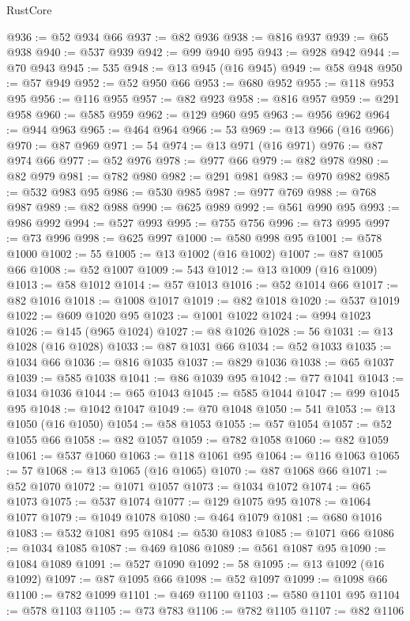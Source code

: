 \begin{lexlean}{RustCore}
\begin{coremodule}
@936 := @52 @934 @66
@937 := @82 @936
@938 := @816 @937
@939 := @65 @938
@940 := @537 @939
@942 := @99 @940 @95
@943 := @928 @942
@944 := @70 @943
@945 := 535
@948 := @13 @945 (@16 @945)
@949 := @58 @948
@950 := @57 @949
@952 := @52 @950 @66
@953 := @680 @952
@955 := @118 @953 @95
@956 := @116 @955
@957 := @82 @923
@958 := @816 @957
@959 := @291 @958
@960 := @585 @959
@962 := @129 @960 @95
@963 := @956 @962
@964 := @944 @963
@965 := @464 @964
@966 := 53
@969 := @13 @966 (@16 @966)
@970 := @87 @969
@971 := 54
@974 := @13 @971 (@16 @971)
@976 := @87 @974 @66
@977 := @52 @976
@978 := @977 @66
@979 := @82 @978
@980 := @82 @979
@981 := @782 @980
@982 := @291 @981
@983 := @970 @982
@985 := @532 @983 @95
@986 := @530 @985
@987 := @977 @769
@988 := @768 @987
@989 := @82 @988
@990 := @625 @989
@992 := @561 @990 @95
@993 := @986 @992
@994 := @527 @993
@995 := @755 @756
@996 := @73 @995
@997 := @73 @996
@998 := @625 @997
@1000 := @580 @998 @95
@1001 := @578 @1000
@1002 := 55
@1005 := @13 @1002 (@16 @1002)
@1007 := @87 @1005 @66
@1008 := @52 @1007
@1009 := 543
@1012 := @13 @1009 (@16 @1009)
@1013 := @58 @1012
@1014 := @57 @1013
@1016 := @52 @1014 @66
@1017 := @82 @1016
@1018 := @1008 @1017
@1019 := @82 @1018
@1020 := @537 @1019
@1022 := @609 @1020 @95
@1023 := @1001 @1022
@1024 := @994 @1023
@1026 := @145 (@965 @1024)
@1027 := @8 @1026
@1028 := 56
@1031 := @13 @1028 (@16 @1028)
@1033 := @87 @1031 @66
@1034 := @52 @1033
@1035 := @1034 @66
@1036 := @816 @1035
@1037 := @829 @1036
@1038 := @65 @1037
@1039 := @585 @1038
@1041 := @86 @1039 @95
@1042 := @77 @1041
@1043 := @1034 @1036
@1044 := @65 @1043
@1045 := @585 @1044
@1047 := @99 @1045 @95
@1048 := @1042 @1047
@1049 := @70 @1048
@1050 := 541
@1053 := @13 @1050 (@16 @1050)
@1054 := @58 @1053
@1055 := @57 @1054
@1057 := @52 @1055 @66
@1058 := @82 @1057
@1059 := @782 @1058
@1060 := @82 @1059
@1061 := @537 @1060
@1063 := @118 @1061 @95
@1064 := @116 @1063
@1065 := 57
@1068 := @13 @1065 (@16 @1065)
@1070 := @87 @1068 @66
@1071 := @52 @1070
@1072 := @1071 @1057
@1073 := @1034 @1072
@1074 := @65 @1073
@1075 := @537 @1074
@1077 := @129 @1075 @95
@1078 := @1064 @1077
@1079 := @1049 @1078
@1080 := @464 @1079
@1081 := @680 @1016
@1083 := @532 @1081 @95
@1084 := @530 @1083
@1085 := @1071 @66
@1086 := @1034 @1085
@1087 := @469 @1086
@1089 := @561 @1087 @95
@1090 := @1084 @1089
@1091 := @527 @1090
@1092 := 58
@1095 := @13 @1092 (@16 @1092)
@1097 := @87 @1095 @66
@1098 := @52 @1097
@1099 := @1098 @66
@1100 := @782 @1099
@1101 := @469 @1100
@1103 := @580 @1101 @95
@1104 := @578 @1103
@1105 := @73 @783
@1106 := @782 @1105
@1107 := @82 @1106

\end{coremodule}
\end{lexlean}
